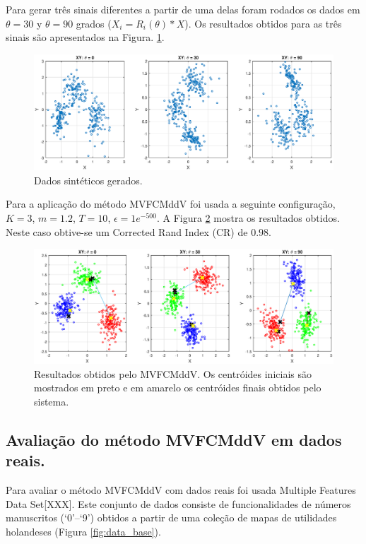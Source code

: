 \documentclass[12pt]{article}
\begin{document}
Para gerar três sinais diferentes a partir de uma delas foram rodados os dados em $\theta = 30$ y $\theta = 90$ grados ($X_i = R_i(\theta)*X$). Os resultados obtidos para as três sinais são apresentados na Figura. \ref{fig:xy_sinteticos}.

\begin{figure}[h]
\centering
\includegraphics[width=4.5in]{../out/xy-sinteticos.eps}
\caption{Dados sintéticos gerados.}
\label{fig:xy_sinteticos}
\end{figure}  

Para a aplicação do método MVFCMddV foi usada a seguinte configuração, $K = 3$, $m = 1.2$, $T = 10$, $\epsilon = 1e^{-500}$. A Figura \ref{fig:cluster_datos_sinteticos} mostra os resultados obtidos. Neste caso obtive-se um Corrected Rand Index (CR) de $0.98$.

\begin{figure}[h]
\centering
\includegraphics[width=4.5in]{../out/clusters-gauss-3.eps}
\caption{Resultados obtidos pelo MVFCMddV. Os centróides iniciais são mostrados em preto e em amarelo os centróides finais obtidos pelo sistema.}
\label{fig:cluster_datos_sinteticos}
\end{figure}  

\subsection{Avaliação do método MVFCMddV em dados reais.}

Para avaliar o método MVFCMddV com dados reais foi usada Multiple Features Data Set[XXX]. Este conjunto de dados consiste de funcionalidades de números manuscritos (`0'--`9') obtidos a partir de uma coleção de mapas de utilidades holandeses (Figura \ref{fig:data_base}).
\end{document}
